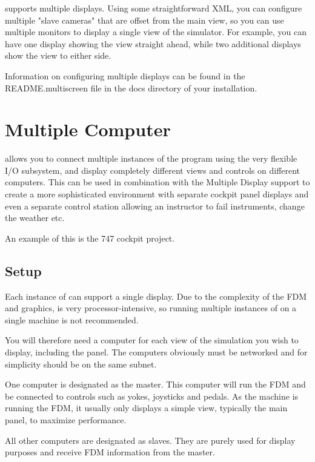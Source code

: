\FlightGear{} supports multiple displays. Using some straightforward
 XML, you can configure multiple "slave cameras" that are offset from
the main view, so you can use multiple monitors to display a
single view of the simulator. For example, you can have one display
showing the view straight ahead, while two additional displays show
the view to either side.

Information on configuring multiple displays can be found in the
README.multiscreen file in the docs directory of your \FlightGear{}
installation.

\section{Multiple Computer}

\FlightGear{} allows you to connect multiple instances of the program
using the very flexible I/O subsystem, and display completely different views
 and controls on different computers. This can be used in combination
 with the Multiple Display support to create a more sophisticated environment
 with separate cockpit panel displays and even a separate control
station allowing an instructor to fail instruments, change the weather etc.

An example of this is the 747 cockpit project.

\noindent
{}

\subsection{Setup}

Each instance of \FlightGear{} can support a single display. Due to the
complexity of the FDM and graphics, \FlightGear{} is very processor-intensive,
so running multiple instances of \FlightGear{} on a single machine is not
recommended.

You will therefore need a computer for each view of the simulation you wish
to display, including the panel. The computers obviously must be networked
and for simplicity should be on the same subnet.

One computer is designated as the master. This computer will run the FDM and
be connected to controls such as yokes, joysticks and pedals. As the machine is
running the FDM, it usually only displays a simple view, typically the main
panel, to maximize performance.

All other computers are designated as slaves. They are purely used for display
purposes and receive FDM information from the master.

